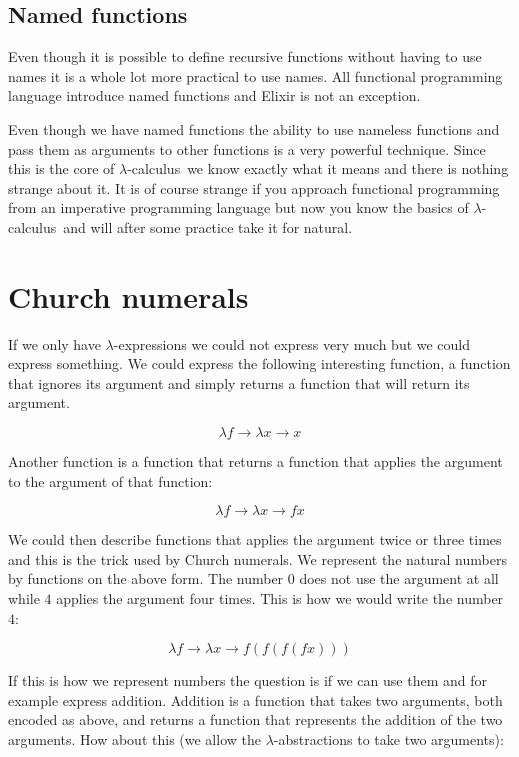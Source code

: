 \documentclass[a4paper,11pt]{article}
\newcommand{\lamc}[0]{$\lambda$-calculus}
\newcommand{\lama}[0]{$\lambda$-abstraction}
\newcommand{\lame}[0]{$\lambda$-expression}
\begin{document}
\subsection{Named functions}

Even though it is possible to define recursive functions without
having to use names it is a whole lot more practical to use names.
All functional programming language introduce named functions and
Elixir is not an exception.

Even though we have named functions the ability to use nameless
functions and pass them as arguments to other functions is a very
powerful technique. Since this is the core of \lamc\ we know exactly
what it means and there is nothing strange about it. It is of course
strange if you approach functional programming from an imperative
programming language but now you know the basics of \lamc\ and will
after some practice take it for natural.



\section{Church numerals}

If we only have \lame s we could not express very much but we could
express something. We could express the following interesting
function, a function that ignores its argument and simply returns a
function that will return its argument. 

$$\lambda f \rightarrow \lambda x \rightarrow x$$

Another function is a function that returns a function that applies
the argument to the argument of that function:

$$\lambda f \rightarrow \lambda x \rightarrow f x$$

We could then describe functions that applies the argument twice
or three times and this is the trick used by Church numerals. We
represent the natural numbers by functions on the above form. The number $0$
does not use the argument at all while $4$ applies the argument four
times. This is how we would write the number $4$:

$$\lambda f \rightarrow \lambda x \rightarrow f (f (f (f x)))$$

If this is how we represent numbers the question is if we can
use them and for example express addition. Addition is a
function that takes two arguments, both encoded as above, and returns
a function that represents the addition of the two arguments. How
about this (we allow the \lama s to take two arguments):
\end{document}
